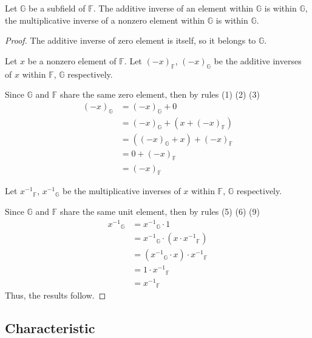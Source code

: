 \begin{theorem}
    Let $\mathbb{G}$ be a subfield of $\mathbb{F}$. The additive inverse of an element within $\mathbb{G}$ is within $\mathbb{G}$, the multiplicative inverse of a nonzero element within $\mathbb{G}$ is within $\mathbb{G}$.
\end{theorem}

\begin{proof}
    The additive inverse of zero element is itself, so it belongs to $\mathbb{G}$.

    Let $x$ be a nonzero element of $\mathbb{F}$. Let ${(-x)}_{\mathbb{F}}$, ${(-x)}_{\mathbb{G}}$ be the additive inverses of $x$ within $\mathbb{F}$, $\mathbb{G}$ respectively.

    Since $\mathbb{G}$ and $\mathbb{F}$ share the same zero element, then by rules (1) (2) (3)
    \begin{align*}
        {(-x)}_{\mathbb{G}} & = {(-x)}_{\mathbb{G}} + 0 \\
                            & = {(-x)}_{\mathbb{G}} + (x + {(-x)}_{\mathbb{F}}) \\
                            & = ({(-x)}_{\mathbb{G}} + x) + {(-x)}_{\mathbb{F}} \\
                            & = 0 + {(-x)}_{\mathbb{F}} \\
                            & = {(-x)}_{\mathbb{F}}
    \end{align*}

    Let ${x^{-1}}_{\mathbb{F}}$, ${x^{-1}}_{\mathbb{G}}$ be the multiplicative inverses of $x$ within $\mathbb{F}$, $\mathbb{G}$ respectively.

    Since $\mathbb{G}$ and $\mathbb{F}$ share the same unit element, then by rules (5) (6) (9)
    \begin{align*}
        {x^{-1}}_{\mathbb{G}} & = {x^{-1}}_{\mathbb{G}}\cdot 1 \\
                              & = {x^{-1}}_{\mathbb{G}}\cdot (x\cdot {x^{-1}}_{\mathbb{F}}) \\
                              & = ({x^{-1}}_{\mathbb{G}}\cdot x)\cdot {x^{-1}}_{\mathbb{F}} \\
                              & = 1\cdot {x^{-1}}_{\mathbb{F}} \\
                              & = {x^{-1}}_{\mathbb{F}}
    \end{align*}
    Thus, the results follow.
\end{proof}

\subsection{Characteristic}

